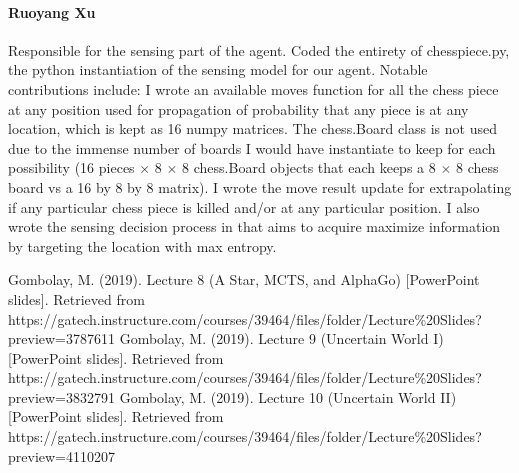 \documentclass[11pt]{article}
\begin{document}
\paragraph{Ruoyang Xu} Responsible for the sensing part of the agent. Coded the entirety of chesspiece.py, the python instantiation of the sensing model for our agent. Notable contributions include: I wrote an available moves function for all the chess piece at any position used for propagation of probability that any piece is at any location, which is kept as 16 numpy matrices. The chess.Board class is not used due to the immense number of boards I would have instantiate to keep for each possibility (16 pieces $\times$ 8 $\times$ 8 chess.Board objects that each keeps a 8 $\times$ 8 chess board vs a 16 by 8 by 8 matrix). I wrote the move result update for extrapolating if any particular chess piece is killed and/or at any particular position. I also wrote the sensing decision process in that aims to acquire maximize information by targeting the location with max entropy.

\iffalse
\begin{thebibliography}{9}
    \bibitem{cancer} 
    Author
    \textit{"place holder"}. 
    SIAM News, Volume 23, Number 5, September 1990, pp 1 \& 18. 
\end{thebibliography}
\fi

\begin{thebibliography}{9}
    Gombolay, M. (2019).
    Lecture 8 (A Star, MCTS, and AlphaGo) [PowerPoint slides]. Retrieved from https://gatech.instructure.com/courses/39464/files/folder/Lecture\%20Slides?preview=3787611
    Gombolay, M. (2019).
    Lecture 9 (Uncertain World I) [PowerPoint slides]. Retrieved from https://gatech.instructure.com/courses/39464/files/folder/Lecture\%20Slides?preview=3832791
    Gombolay, M. (2019).
    Lecture 10 (Uncertain World II) [PowerPoint slides]. Retrieved from https://gatech.instructure.com/courses/39464/files/folder/Lecture\%20Slides?preview=4110207
\end{thebibliography}
\end{document}
